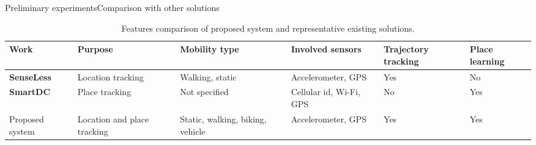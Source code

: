 \begin{frame}{Preliminary experiments}{Comparison with other solutions}
\begin{table}[]
\centering
\small
\renewcommand{\arraystretch}{1.2}
\begin{tabular}{@{}p{1cm}p{1.8cm}p{1.6cm}p{1.4cm}p{1cm}p{1cm}@{}}
\toprule
\textbf{Work} &
\textbf{Purpose} &
\textbf{Mobility type} &
\textbf{Involved sensors} &
\textbf{Trajectory tracking} &
\textbf{Place learning} \\ 
\midrule

\textbf{SenseLess} &
Location tracking &
Walking, static &
Accelerometer, GPS &
Yes &
No \\

\cmidrule[0.25pt]{1-6}
\textbf{SmartDC} &
Place tracking &
Not specified &
Cellular id, Wi-Fi, GPS&
No &
Yes \\

\cmidrule[0.25pt]{1-6}
Proposed system &
Location and place tracking &
Static, walking, biking, vehicle &
Accelerometer, GPS &
Yes &
Yes \\

\bottomrule
\end{tabular}%

\caption{Features comparison of proposed system and representative existing solutions.}
\end{table}
\end{frame}
